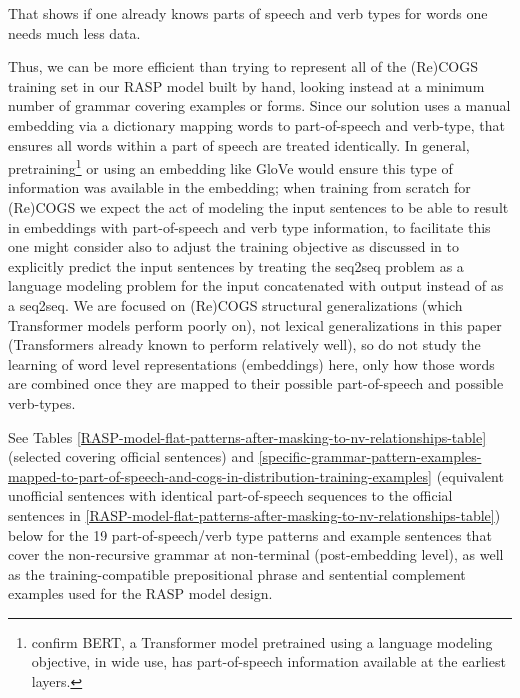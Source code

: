 \documentclass[11pt]{article}
\begin{document}
That shows if one already knows parts of speech and verb types for words one needs much less data.

Thus, we can be more efficient than trying to represent all of the (Re)COGS training set in our RASP model built by hand, looking instead at a minimum number of grammar covering examples or forms.
Since our solution uses a manual embedding via a dictionary mapping words to part-of-speech and verb-type, that ensures all words within a part of speech are treated identically. In general, pretraining\footnote{\cite{tenney2019bertrediscoversclassicalnlp} confirm BERT, a Transformer model pretrained using a language modeling objective, in wide use, has part-of-speech information available at the earliest layers.} or using an embedding like GloVe \cite{pennington-etal-2014-glove} would ensure this type of information was available in the embedding; when training from scratch for (Re)COGS we expect the act of modeling the input sentences to be able to result in embeddings with part-of-speech and verb type information, to facilitate this one might consider also to adjust the training objective as discussed in \cite{10.1162/tacl_a_00733} to explicitly predict the input sentences by treating the seq2seq problem as a language modeling problem for the input concatenated with output instead of as a seq2seq. We are focused on (Re)COGS structural generalizations (which Transformer models perform poorly on), not lexical generalizations in this paper (Transformers already known to perform relatively well), so do not study the learning of word level representations (embeddings) here, only how those words are combined once they are mapped to their possible part-of-speech and possible verb-types.

See Tables \ref{RASP-model-flat-patterns-after-masking-to-nv-relationships-table} (selected covering official sentences) and \ref{specific-grammar-pattern-examples-mapped-to-part-of-speech-and-cogs-in-distribution-training-examples} (equivalent unofficial sentences with identical part-of-speech sequences to the official sentences in \ref{RASP-model-flat-patterns-after-masking-to-nv-relationships-table}) below for the 19 part-of-speech/verb type patterns and example sentences that cover the non-recursive grammar at non-terminal (post-embedding level), as well as the training-compatible prepositional phrase and sentential complement examples used for the RASP model design.
\end{document}
